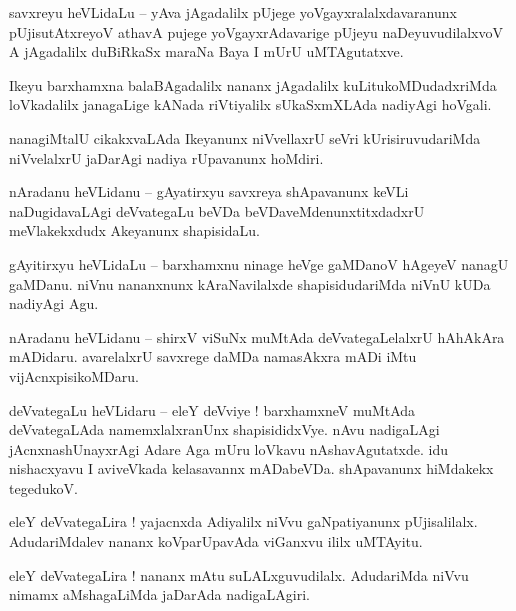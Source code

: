 \documentclass{article}
\begin{document}
\begin{mn}%
savxreyu heVLidaLu -- yAva jAgadalilx pUjege yoVgayxralalxdavaranunx pUjisutAtxreyoV athavA pujege 
yoVgayxrAdavarige pUjeyu naDeyuvudilalxvoV A jAgadalilx duBiRkaSx maraNa Baya  I mUrU uMTAgutatxve.
\end{mn}

\begin{mn}%
Ikeyu barxhamxna balaBAgadalilx nananx jAgadalilx kuLitukoMDudadxriMda loVkadalilx janagaLige 
kANada riVtiyalilx sUkaSxmXLAda nadiyAgi hoVgali.
\end{mn}

\begin{mn}%
nanagiMtalU cikakxvaLAda Ikeyanunx niVvellaxrU seVri kUrisiruvudariMda niVvelalxrU jaDarAgi nadiya 
rUpavanunx hoMdiri.
\end{mn}

\begin{mn}%
nAradanu heVLidanu -- gAyatirxyu savxreya shApavanunx keVLi naDugidavaLAgi deVvategaLu beVDa 
beVDaveMdenunxtitxdadxrU meVlakekxdudx Akeyanunx shapisidaLu.
\end{mn}

\begin{mn}%
gAyitirxyu heVLidaLu -- barxhamxnu ninage heVge gaMDanoV hAgeyeV nanagU gaMDanu. niVnu nananxnunx 
kAraNavilalxde shapisidudariMda niVnU kUDa nadiyAgi Agu.
\end{mn}

\begin{mn}%
nAradanu heVLidanu -- shirxV viSuNx muMtAda deVvategaLelalxrU hAhAkAra mADidaru. avarelalxrU 
savxrege daMDa namasAkxra mADi iMtu vijAcnxpisikoMDaru.
\end{mn}

\begin{mn}%
deVvategaLu heVLidaru -- eleY deVviye ! barxhamxneV muMtAda deVvategaLAda namemxlalxranUnx 
shapisididxVye. nAvu nadigaLAgi jAcnxnashUnayxrAgi Adare Aga mUru loVkavu nAshavAgutatxde. idu 
nishacxyavu I aviveVkada kelasavannx mADabeVDa. shApavanunx hiMdakekx tegedukoV.
\end{mn}

\begin{mn}%
eleY deVvategaLira ! yajacnxda Adiyalilx niVvu gaNpatiyanunx pUjisalilalx. AdudariMdalev nananx 
koVparUpavAda viGanxvu ililx uMTAyitu.
\end{mn}

\begin{mn}%
eleY deVvategaLira ! nananx mAtu suLALxguvudilalx. AdudariMda niVvu nimamx aMshagaLiMda jaDarAda 
nadigaLAgiri.
\end{mn}
\end{document}
